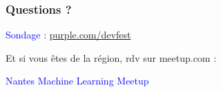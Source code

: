 \documentclass[t]{beamer}
\newcommand\blue[1]{\textcolor{blue}{#1}}
\begin{document}

\begin{frame}
  \frametitle{Questions ?}

  \vspace{1cm}
  \centerline{\blue{Sondage : \url{purple.com/devfest}}}

  \vspace{1cm}
  \centerline{Et si vous êtes de la région, rdv sur meetup.com :}

  \bigskip
  \centerline{\blue{Nantes Machine Learning Meetup}}
\end{frame}
\end{document}
